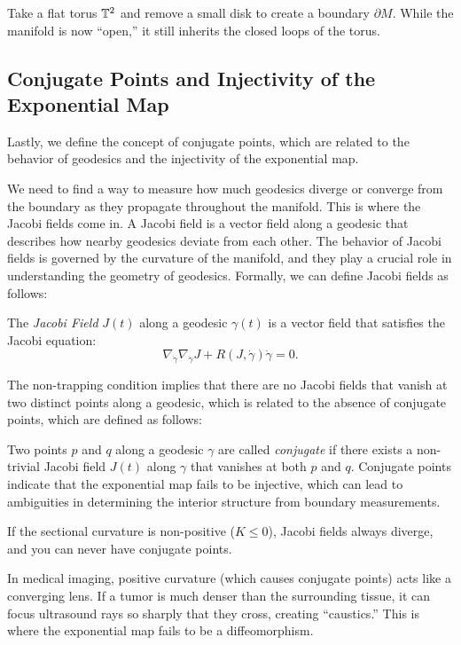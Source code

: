 \begin{example}
  Take a flat torus $\mathbb{T}^2$ and remove a small disk to create a boundary $\partial M$. While the manifold is now ``open,'' it still inherits the closed loops of the torus.
\end{example}

\subsection{Conjugate Points and Injectivity of the Exponential Map} Lastly, we define the concept of conjugate points, which are related to the behavior of geodesics and the injectivity of the exponential map.

We need to find a way to measure how much geodesics diverge or converge from the boundary as they propagate throughout the manifold. This is where the Jacobi fields come in. A Jacobi field is a vector field along a geodesic that describes how nearby geodesics deviate from each other. The behavior of Jacobi fields is governed by the curvature of the manifold, and they play a crucial role in understanding the geometry of geodesics. Formally, we can define Jacobi fields as follows:

\begin{definition}
  The \emph{Jacobi Field} $J(t)$ along a geodesic $\gamma(t)$ is a vector field that satisfies the Jacobi equation:
  \[%
    \nabla_{\dot{\gamma}} \nabla_{\dot{\gamma}} J + R(J, \dot{\gamma})\dot{\gamma} = 0
  .\]%
\end{definition}

The non-trapping condition implies that there are no Jacobi fields that vanish at two distinct points along a geodesic, which is related to the absence of conjugate points, which are defined as follows:

\begin{definition}
  Two points $p$ and $q$ along a geodesic $\gamma$ are called \emph{conjugate} if there exists a non-trivial Jacobi field $J(t)$ along $\gamma$ that vanishes at both $p$ and $q$. Conjugate points indicate that the exponential map fails to be injective, which can lead to ambiguities in determining the interior structure from boundary measurements.
\end{definition}

If the sectional curvature is non-positive ($K \le 0$), Jacobi fields always diverge, and you can never have conjugate points.

In medical imaging, positive curvature (which causes conjugate points) acts like a converging lens. If a tumor is much denser than the surrounding tissue, it can focus ultrasound rays so sharply that they cross, creating ``caustics.'' This is where the exponential map fails to be a diffeomorphism.

